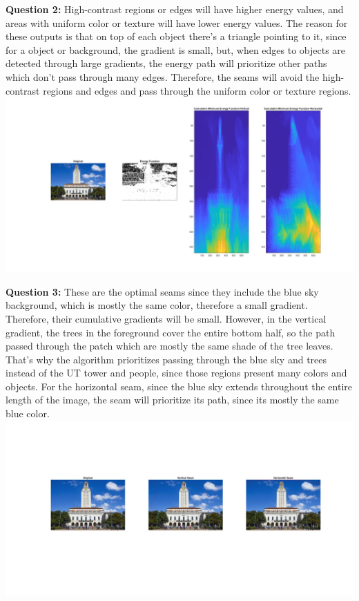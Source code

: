 \documentclass[11pt]{article}
\begin{document}
    \textbf{Question 2:}\newline
    High-contrast regions or edges will have higher energy values, and areas with uniform color or texture will have lower energy values.
    The reason for these outputs is that on top of each object there's a
    triangle pointing to it, since for a object or background, the gradient
    is small, but, when edges to objects are detected through large
    gradients, the energy path will prioritize other paths which don't pass
    through many edges. Therefore, the seams will avoid the high-contrast regions and edges and pass through the uniform color or texture regions.\newline
    \includegraphics[width=\linewidth]{Part 2 Pictures/question2}\newline

    \textbf{Question 3:}\newline
    These are the optimal seams since they include the blue sky background,
    which is mostly the same color, therefore a small gradient. Therefore, their cumulative gradients will
    be small. However, in the vertical gradient, the trees in the foreground
    cover the entire bottom half, so the path passed through the patch which
    are mostly the same shade of the tree leaves. That's why the algorithm prioritizes passing through the blue sky and trees instead of the UT
    tower and people, since those regions present many colors and objects. For the horizontal seam, since the blue sky extends throughout the
    entire length of the image, the seam will prioritize its path, since its mostly the same blue color.\newline
    \includegraphics[width=\linewidth]{Part 2 Pictures/question3}\newline
\end{document}
